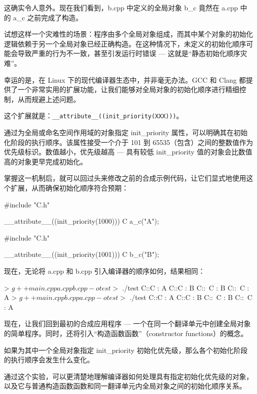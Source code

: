 这确实令人意外。现在我们看到，b.cpp 中定义的全局对象 b\_c 竟然在 a.cpp 中的 a\_c 之前完成了构造。

试想这样一个灾难性的场景：程序由多个全局对象组成，而其中某个对象的初始化逻辑依赖于另一个全局对象已经正确构造。在这种情况下，未定义的初始化顺序可能会导致严重的行为不一致，甚至引发运行时错误 --- 这就是“静态初始化顺序灾难”。

幸运的是，在 Linux 下的现代编译器生态中，并非毫无办法。GCC 和 Clang 都提供了一个非常实用的扩展功能，让我们能够对全局对象的初始化顺序进行精细控制，从而规避上述问题。

这个扩展就是：\verb|__attribute__((init_priority(XXX)))|。

通过为全局或命名空间作用域的对象指定 init\_priority 属性，可以明确其在初始化阶段的执行顺序。该属性接受一个介于 101 到 65535（包含）之间的整数值作为优先级标识。数值越小，优先级越高 --- 具有较低 init\_priority 值的对象会比数值高的对象更早完成初始化。

掌握这一机制后，就可以回过头来修改之前的合成示例代码，让它们显式地使用这个扩展，从而确保初始化顺序符合预期：


\begin{cpp}
#include "C.h"

__attribute__((init_priority(1000))) C a_c("A");
\end{cpp}


\begin{cpp}
#include "C.h"

__attribute__((init_priority(1001))) C b_c("B");
\end{cpp}

现在，无论将 a.cpp 和 b.cpp 引入编译器的顺序如何，结果相同：

\begin{shell}
> $ g++ main.cpp a.cpp b.cpp -o test
> $ ./test
C::C : A
C::C : B
C::~C : B
C::~C : A
> $ g++ main.cpp b.cpp a.cpp -o test
> $ ./test
C::C : A
C::C : B
C::~C : B
C::~C : A
\end{shell}

现在，让我们回到最初的合成应用程序 --- 一个在同一个翻译单元中创建全局对象的简单程序。同时，还将引入“构造函数函数”（constructor functions）的概念。

如果为其中一个全局对象指定 init\_priority 初始化优先级，那么各个初始化阶段的执行顺序会发生什么变化。

通过这个实验，可以更清楚地理解编译器如何处理具有指定初始化优先级的对象，以及它与普通构造函数函数和同一翻译单元内全局对象之间的初始化顺序关系。


